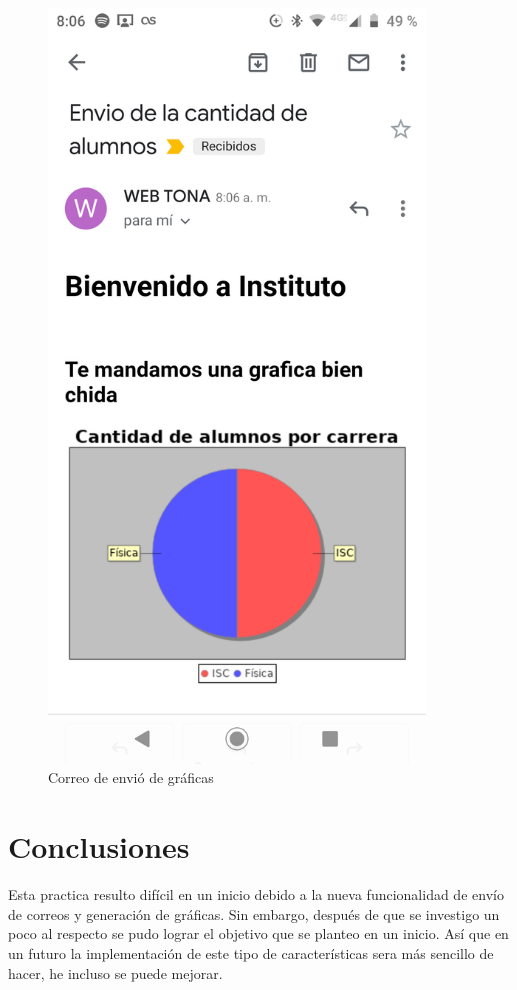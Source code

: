 \documentclass[a4paper,12pt]{article}
\begin{document}
\begin{figure}[H]
\begin{center}
 \includegraphics[width=10cm]{envio.png}
 \caption{Correo de envió de gráficas}
 \label{fig:envio}
\end{center}
\end{figure}
\section{Conclusiones}
Esta practica resulto difícil en un inicio debido a la nueva funcionalidad de 
envío de correos y generación de gráficas. Sin embargo, después de que se 
investigo un poco al respecto se pudo lograr el objetivo que se planteo en un 
inicio. Así que en un futuro la implementación de este tipo de características 
sera más sencillo de hacer, he incluso se puede mejorar.
\end{document}
